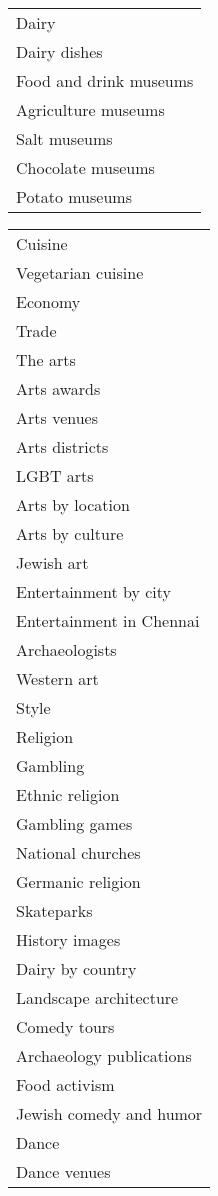 \begin{table*}[h]
\begin{minipage}{0.48\textwidth}
\begin{tabular}{|l|}
Dairy \\
Dairy dishes \\
Food and drink museums \\
Agriculture museums \\
Salt museums \\
Chocolate museums \\
Potato museums \\
\hline
\end{tabular}
\end{minipage}
\hfill %
\begin{minipage}{0.48\textwidth}
\centering
\begin{tabular}{|l|}
\hline
Cuisine \\
Vegetarian cuisine \\
Economy \\
Trade \\
The arts \\
Arts awards \\
Arts venues \\
Arts districts \\
LGBT arts \\
Arts by location \\
Arts by culture \\
Jewish art \\
Entertainment by city \\
Entertainment in Chennai \\
Archaeologists \\
Western art \\
Style \\
Religion \\
Gambling \\
Ethnic religion \\
Gambling games \\
National churches \\
Germanic religion \\
Skateparks \\
History images \\
Dairy by country \\
Landscape architecture \\
Comedy tours \\
Archaeology publications \\
Food activism \\
Jewish comedy and humor \\
Dance \\
Dance venues \\

\end{tabular}
\end{minipage}
\end{table*}
